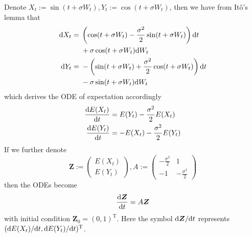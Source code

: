 \documentclass{homework}
\begin{document}
    \problem
    \newcommand{\X}{\boldsymbol Z}
    Denote $X_t:=\sin(t+\sigma W_t),Y_t:=\cos(t+\sigma W_t)$,
    then we have from It\^o's lemma that
    \[\begin{aligned}
        \mathrm d X_t&=
        \begin{aligned}[t]
        &\left(\cos(t+\sigma W_t)-\frac{\sigma^2}{2}\sin(t+\sigma W_t)\right)\mathrm d t\\
        &+\sigma\cos(t+\sigma W_t)\mathrm d W_t\\
        \end{aligned}\\
        \mathrm d Y_t&=
        \begin{aligned}[t]
        &-\left(\sin(t+\sigma W_t)+\frac{\sigma^2}{2}\cos(t+\sigma W_t)\right)\mathrm d t\\
        &-\sigma\sin(t+\sigma W_t)\mathrm d W_t
        \end{aligned}
    \end{aligned}\]
    which derives the ODE of expectation accordingly
    \[\begin{aligned}
        \frac{\mathrm d E(X_t)}{\mathrm d t}&=E(Y_t)-\frac{\sigma^2}{2}E(X_t)\\
        \frac{\mathrm d E(Y_t)}{\mathrm d t}&=-E(X_t)-\frac{\sigma^2}{2}E(Y_t)
    \end{aligned}\]
    If we further denote
    \[\X:=\begin{pmatrix}
        E(X_t)\\
        E(Y_t)
    \end{pmatrix},
    A:=\begin{pmatrix}
        -\frac{\sigma^2}{2} & 1\\
        -1 & -\frac{\sigma^2}{2}
    \end{pmatrix}\]
    then the ODEs become
    \[\frac{\diff\X}{\diff t}=A\X\]
    with initial condition $\X_0=(0,1)^\mathrm T$.
    Here the symbol $\diff\X/\diff t$ represents
    $(\mathrm d E(X_t)/\mathrm d t,\mathrm d E(Y_t)/\mathrm d t)^\mathrm T$.
\end{document}
